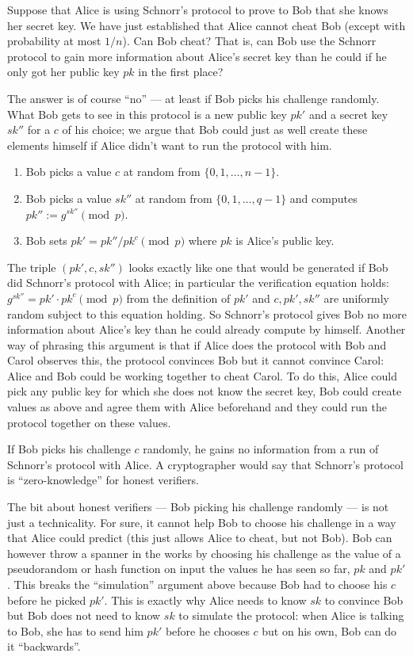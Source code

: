 \documentclass{llncs}
\begin{document}
Suppose that Alice is using Schnorr's protocol to prove to Bob that she knows
her secret key. We have just established that Alice cannot cheat Bob (except
with probability at most $1/n$). Can Bob cheat? That is, can Bob use the
Schnorr protocol to gain more information about Alice's secret key than he could
if he only got her public key $pk$ in the first place?

The answer is of course ``no'' --- at least if Bob picks his challenge randomly.
What Bob gets to see in this protocol is a new public key $pk'$ and a secret key
$sk''$ for a $c$ of his choice; we argue that Bob could just as well create
these elements himself if Alice didn't want to run the protocol with him.
\begin{enumerate}
\item Bob picks a value $c$ at random from $\{0, 1, \ldots, n-1\}$.
\item Bob picks a value $sk''$ at random from $\{0, 1, \ldots, q-1\}$ and
computes $pk'' := g^{sk''} \pmod{p}$.
\item Bob sets $pk' = pk''/pk^c \pmod{p}$ where $pk$ is Alice's public key.
\end{enumerate}
The triple $(pk', c, sk'')$ looks exactly like one that would be generated if
Bob did Schnorr's protocol with Alice; in particular the verification equation
holds: $g^{sk''} = pk' \cdot pk^c \pmod{p}$ from the definition of $pk'$ and
$c, pk', sk''$ are uniformly random subject to this equation holding.
So Schnorr's protocol gives Bob no more information about Alice's key than he
could already compute by himself. Another way of phrasing this argument is that
if Alice does the protocol with Bob and Carol observes this, the protocol
convinces Bob but it cannot convince Carol: Alice and Bob could be working
together to cheat Carol. To do this, Alice could pick any public key for which
she does not know the secret key, Bob could create values as above and agree
them with Alice beforehand and they could run the protocol together on these
values.

\begin{proposition}
If Bob picks his challenge $c$ randomly, he gains no information from a run of
Schnorr's protocol with Alice. A cryptographer would say that Schnorr's
protocol is ``zero-knowledge'' for honest verifiers.
\end{proposition}

The bit about honest verifiers --- Bob picking his challenge randomly --- is not
just a technicality. For sure, it cannot help Bob to choose his challenge in a
way that Alice could predict (this just allows Alice to cheat, but not Bob). Bob
can however throw a spanner in the works by choosing his challenge as the value
of a pseudorandom or hash function on input the values he has seen so far, $pk$
and $pk'$. This breaks the ``simulation'' argument above because Bob had to
choose his $c$ before he picked $pk'$. This is exactly why Alice needs to know
$sk$ to convince Bob but Bob does not need to know $sk$ to simulate the
protocol: when Alice is talking to Bob, she has to send him $pk'$ before he
chooses $c$ but on his own, Bob can do it ``backwards''.
\end{document}
